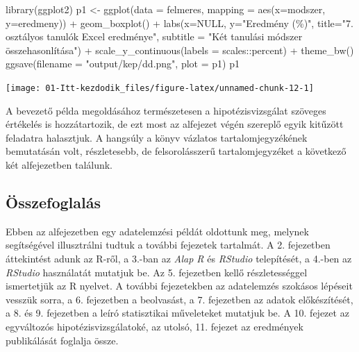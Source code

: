 \documentclass[
]{book}
\makeatletter
\newenvironment{Shaded}{\begin{snugshade}}{\end{snugshade}}
\newcommand{\AttributeTok}[1]{\textcolor[rgb]{0.77,0.63,0.00}{#1}}
\newcommand{\ConstantTok}[1]{\textcolor[rgb]{0.00,0.00,0.00}{#1}}
\newcommand{\FunctionTok}[1]{\textcolor[rgb]{0.00,0.00,0.00}{#1}}
\newcommand{\NormalTok}[1]{#1}
\newcommand{\OtherTok}[1]{\textcolor[rgb]{0.56,0.35,0.01}{#1}}
\newcommand{\SpecialCharTok}[1]{\textcolor[rgb]{0.00,0.00,0.00}{#1}}
\newcommand{\StringTok}[1]{\textcolor[rgb]{0.31,0.60,0.02}{#1}}
\newenvironment{kframe}{%
\medskip{}
\setlength{\fboxsep}{.8em}
 \def\at@end@of@kframe{}%
 \ifinner\ifhmode%
  \def\at@end@of@kframe{\end{minipage}}%
  \begin{minipage}{\columnwidth}%
 \fi\fi%
 \def\FrameCommand##1{\hskip\@totalleftmargin \hskip-\fboxsep
 \colorbox{shadecolor}{##1}\hskip-\fboxsep
     \hskip-\linewidth \hskip-\@totalleftmargin \hskip\columnwidth}%
 \MakeFramed {\advance\hsize-\width
   \@totalleftmargin\z@ \linewidth\hsize
   \@setminipage}}%
 {\par\unskip\endMakeFramed%
 \at@end@of@kframe}
\newenvironment{rmdblock}[1]
  {
  \begin{itemize}
  \renewcommand{\labelitemi}{
    \raisebox{-.7\height}[0pt][0pt]{
      {\setkeys{Gin}{width=3em,keepaspectratio}\texttt{[image: images/\#1]}}
    }
  }
  \setlength{\fboxsep}{1em}
  \begin{kframe}
  \item
  }
  {
  \end{kframe}
  \end{itemize}
  }
\newenvironment{rmdsummary}
  {\begin{rmdblock}{summary}}
  {\end{rmdblock}}
\makeatother
\begin{document}
\begin{Shaded}
\begin{Highlighting}[]
\FunctionTok{library}\NormalTok{(ggplot2)}
\NormalTok{p1 }\OtherTok{\textless{}{-}} \FunctionTok{ggplot}\NormalTok{(}\AttributeTok{data =}\NormalTok{ felmeres, }\AttributeTok{mapping =} \FunctionTok{aes}\NormalTok{(}\AttributeTok{x=}\NormalTok{modszer, }\AttributeTok{y=}\NormalTok{eredmeny)) }\SpecialCharTok{+} 
  \FunctionTok{geom\_boxplot}\NormalTok{() }\SpecialCharTok{+} 
  \FunctionTok{labs}\NormalTok{(}\AttributeTok{x=}\ConstantTok{NULL}\NormalTok{, }\AttributeTok{y=}\StringTok{"Eredmény (\%)"}\NormalTok{, }
       \AttributeTok{title=}\StringTok{"7. osztályos tanulók Excel eredménye"}\NormalTok{, }
       \AttributeTok{subtitle =} \StringTok{"Két tanulási módszer összehasonlítása"}\NormalTok{) }\SpecialCharTok{+} 
  \FunctionTok{scale\_y\_continuous}\NormalTok{(}\AttributeTok{labels =}\NormalTok{ scales}\SpecialCharTok{::}\NormalTok{percent) }\SpecialCharTok{+} \FunctionTok{theme\_bw}\NormalTok{()}
\FunctionTok{ggsave}\NormalTok{(}\AttributeTok{filename =} \StringTok{"output/kep/dd.png"}\NormalTok{, }\AttributeTok{plot =}\NormalTok{ p1)}
\NormalTok{p1}
\end{Highlighting}
\end{Shaded}

\begin{center}\texttt{[image: 01-Itt-kezdodik\_files/figure-latex/unnamed-chunk-12-1]} \end{center}

A bevezető példa megoldásához természetesen a hipotézisvizsgálat szöveges értékelés is hozzátartozik, de ezt most az alfejezet végén szereplő egyik kitűzött feladatra halasztjuk. A hangsúly a könyv vázlatos tartalomjegyzékének bemutatásán volt, részletesebb, de felsorolásszerű tartalomjegyzéket a következő két alfejezetben találunk.

\hypertarget{itt-kezdodik-1-summary}{%
\subsection{Összefoglalás}\label{itt-kezdodik-1-summary}}

\begin{rmdsummary}
Ebben az alfejezetben egy adatelemzési példát oldottunk meg, melynek
segítségével illusztrálni tudtuk a további fejezetek tartalmát. A 2.
fejezetben áttekintést adunk az R-ről, a 3.-ban az \emph{Alap R} és
\emph{RStudio} telepítését, a 4.-ben az \emph{RStudio} használatát
mutatjuk be. Az 5. fejezetben kellő részletességgel ismertetjük az R
nyelvet. A további fejezetekben az adatelemzés szokásos lépéseit vesszük
sorra, a 6. fejezetben a beolvasást, a 7. fejezetben az adatok
előkészítését, a 8. és 9. fejezetben a leíró statisztikai műveleteket
mutatjuk be. A 10. fejezet az egyváltozós hipotézisvizsgálatoké, az
utolsó, 11. fejezet az eredmények publikálását foglalja össze.
\end{rmdsummary}
\end{document}

